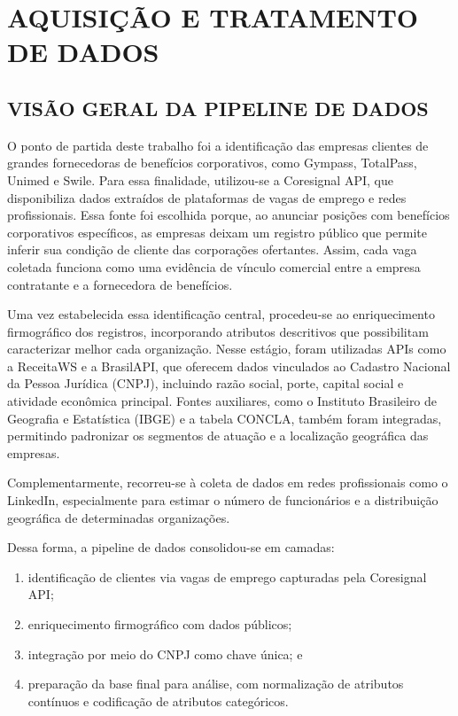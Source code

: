 \chapter{AQUISIÇÃO E TRATAMENTO DE DADOS}

\section{VISÃO GERAL DA PIPELINE DE DADOS}

O ponto de partida deste trabalho foi a identificação das empresas clientes de grandes fornecedoras de benefícios corporativos, como Gympass, TotalPass, Unimed e Swile. Para essa finalidade, utilizou-se a Coresignal API, que disponibiliza dados extraídos de plataformas de vagas de emprego e redes profissionais. Essa fonte foi escolhida porque, ao anunciar posições com benefícios corporativos específicos, as empresas deixam um registro público que permite inferir sua condição de cliente das corporações ofertantes. Assim, cada vaga coletada funciona como uma evidência de vínculo comercial entre a empresa contratante e a fornecedora de benefícios.

Uma vez estabelecida essa identificação central, procedeu-se ao enriquecimento firmográfico dos registros, incorporando atributos descritivos que possibilitam caracterizar melhor cada organização. Nesse estágio, foram utilizadas APIs como a ReceitaWS e a BrasilAPI, que oferecem dados vinculados ao Cadastro Nacional da Pessoa Jurídica (CNPJ), incluindo razão social, porte, capital social e atividade econômica principal. Fontes auxiliares, como o Instituto Brasileiro de Geografia e Estatística (IBGE) e a tabela CONCLA, também foram integradas, permitindo padronizar os segmentos de atuação e a localização geográfica das empresas.

Complementarmente, recorreu-se à coleta de dados em redes profissionais como o LinkedIn, especialmente para estimar o número de funcionários e a distribuição geográfica de determinadas organizações.

Dessa forma, a pipeline de dados consolidou-se em camadas: 
\begin{enumerate}
    \item identificação de clientes via vagas de emprego capturadas pela Coresignal API;
    \item enriquecimento firmográfico com dados públicos;
    \item integração por meio do CNPJ como chave única; e
    \item preparação da base final para análise, com normalização de atributos contínuos e codificação de atributos categóricos.
\end{enumerate}

